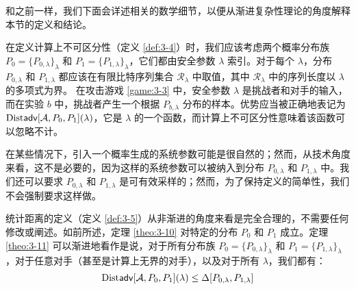 和之前一样，我们下面会详述相关的数学细节，以便从渐进复杂性理论的角度解释本节的定义和结论。

在定义计算上不可区分性（定义 \ref{def:3-4}）时，我们应该考虑两个概率分布族 $P_0=\{P_{0,\lambda}\}_{\lambda}$ 和 $P_1=\{P_{1,\lambda}\}_{\lambda}$，它们都由安全参数 $\lambda$ 索引。对于每个 $\lambda$，分布 $P_{0,\lambda}$ 和 $P_{1,\lambda}$ 都应该在有限比特序列集合 $\mathcal{R}_\lambda$ 中取值，其中 $\mathcal{R}_\lambda$ 中的序列长度以 $\lambda$ 的多项式为界。 在攻击游戏 \ref{game:3-3} 中，安全参数 $\lambda$ 是挑战者和对手的输入，而在实验 $b$ 中，挑战者产生一个根据 $P_{b,\lambda}$ 分布的样本。优势应当被正确地表记为 ${\rm Dist\mathsf{adv}}[\mathcal{A},P_0,P_1](\lambda)$，它是 $\lambda$ 的一个函数，而计算上不可区分性意味着该函数可以忽略不计。

在某些情况下，引入一个概率生成的系统参数可能是很自然的；然而，从技术角度来看，这不是必要的，因为这样的系统参数可以被纳入到分布 $P_{0,\lambda}$ 和 $P_{1,\lambda}$ 中。我们还可以要求 $P_{0,\lambda}$ 和 $P_{1,\lambda}$ 是可有效采样的；然而，为了保持定义的简单性，我们不会强制要求这样做。

统计距离的定义（定义 \ref{def:3-5}）从非渐进的角度来看是完全合理的，不需要任何修改或阐述。如前所述，定理 \ref{theo:3-10} 对特定的分布 $P_0$ 和 $P_1$ 成立。定理 \ref{theo:3-11} 可以渐进地看作是说，对于所有分布族 $P_0=\{P_{0,\lambda}\}_{\lambda}$ 和 $P_1=\{P_{1,\lambda}\}_{\lambda}$，对于任意对手（甚至是计算上无界的对手），以及对于所有 $\lambda$，我们都有：
\[
{\rm Dist\mathsf{adv}}[\mathcal{A},P_0,P_1](\lambda)\leq\Delta[P_{0,\lambda},P_{1,\lambda}]
\]